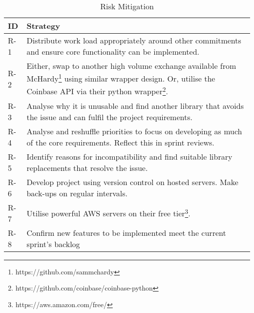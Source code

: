 \begin{table}[htb!]
\centering
\begin{tabular}{|l|p{}|}
\hline
\textbf{ID} & \textbf{Strategy} \\ \hline\hline
R-1 & Distribute work load appropriately around other commitments and ensure core functionality can be implemented. \\ \hline
R-2 & Either, swap to another high volume exchange available from McHardy\footnote{https://github.com/sammchardy} using similar wrapper design. Or, utilise the Coinbase API via their python wrapper\footnote{https://github.com/coinbase/coinbase-python}. \\ \hline
R-3 & Analyse why it is unusable and find another library that avoids the issue and can fulfil the project requirements. \\ \hline
R-4 & Analyse and reshuffle priorities to focus on developing as much of the core requirements. Reflect this in sprint reviews. \\ \hline
R-5 & Identify reasons for incompatibility and find suitable library replacements that resolve the issue. \\ \hline
R-6 & Develop project using version control on hosted servers. Make back-ups on regular intervals. \\ \hline
R-7 & Utilise powerful AWS servers on their free tier\footnote{https://aws.amazon.com/free/}. \\ \hline
R-8 & Confirm new features to be implemented meet the current sprint's backlog  \\ \hline
\end{tabular}
\caption{Risk Mitigation}
\label{table:management:risk_mitigation}
\end{table}
